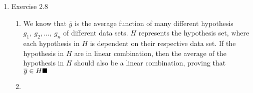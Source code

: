 \documentclass{article}
\begin{document}
    \begin{enumerate}
        \item Exercise 2.8
        \begin{enumerate}[label=(\alph*)]
            \item We know that $\overline{g}$ is the average function of many different hypothesis $g_1,\ g_2,...,\ g_n$ of different data sets. $H$ represents the hypothesis set, where each hypothesis in $H$ is dependent on their respective data set. If the hypothesis in $H$ are in linear combination, then the average of the hypothesis in $H$ should also be a linear combination, proving that $\overline{g} \in H \hfill \blacksquare$
            \item 
        \end{enumerate}
    \end{enumerate}
\end{document}
